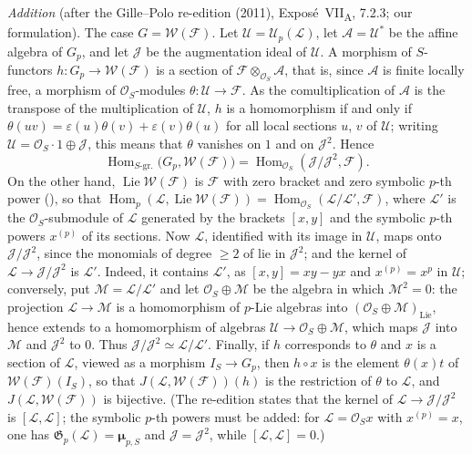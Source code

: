 \par\medskip\noindent
\emph{Addition} (after the Gille--Polo re-edition (2011),
Expos\'e~VII\textsubscript{A}, 7.2.3; our formulation). The case
\(G=\mathcal W(\mathcal F)\). Let \(\mathcal U=\mathcal U_p(\mathcal L)\),
let \(\mathcal A=\mathcal U^{*}\) be the affine algebra of \(G_p\), and
let \(\mathcal J\) be the augmentation ideal of \(\mathcal U\). A morphism
of \(S\)-functors \(h:G_p\to\mathcal W(\mathcal F)\) is a section of
\(\mathcal F\otimes_{\mathcal O_S}\mathcal A\), that is, since
\(\mathcal A\) is finite locally free, a morphism of
\(\mathcal O_S\)-modules \(\theta:\mathcal U\to\mathcal F\). As the
comultiplication of \(\mathcal A\) is the transpose of the multiplication
of \(\mathcal U\), \(h\) is a homomorphism if and only if
\(\theta(uv)=\varepsilon(u)\theta(v)+\varepsilon(v)\theta(u)\) for all
local sections \(u\), \(v\) of \(\mathcal U\); writing
\(\mathcal U=\mathcal O_S\cdot1\oplus\mathcal J\), this means that
\(\theta\) vanishes on \(1\) and on \(\mathcal J^2\). Hence
\[
  \operatorname{Hom}_{S\text{-gr.}}\bigl(G_p,\mathcal W(\mathcal F)\bigr)
  =\operatorname{Hom}_{\mathcal O_S}(\mathcal J/\mathcal J^2,\mathcal F).
\]
On the other hand, \(\operatorname{Lie}\mathcal W(\mathcal F)\) is
\(\mathcal F\) with zero bracket and zero symbolic \(p\)-th power
(), so that
\(\operatorname{Hom}_p(\mathcal L,\operatorname{Lie}\mathcal W(\mathcal F))
=\operatorname{Hom}_{\mathcal O_S}(\mathcal L/\mathcal L',\mathcal F)\),
where \(\mathcal L'\) is the \(\mathcal O_S\)-submodule of \(\mathcal L\)
generated by the brackets \([x,y]\) and the symbolic \(p\)-th powers
\(x^{(p)}\) of its sections. Now \(\mathcal L\), identified with its image
in \(\mathcal U\), maps onto \(\mathcal J/\mathcal J^2\), since the
monomials of degree \(\geq2\) of  lie in \(\mathcal J^2\); and
the kernel of \(\mathcal L\to\mathcal J/\mathcal J^2\) is
\(\mathcal L'\). Indeed, it contains \(\mathcal L'\), as \([x,y]=xy-yx\)
and \(x^{(p)}=x^p\) in \(\mathcal U\); conversely, put
\(\mathcal M=\mathcal L/\mathcal L'\) and let
\(\mathcal O_S\oplus\mathcal M\) be the algebra in which
\(\mathcal M^2=0\): the projection \(\mathcal L\to\mathcal M\) is a
homomorphism of \(p\)-Lie algebras into
\((\mathcal O_S\oplus\mathcal M)_{\mathrm{Lie}}\), hence extends to a
homomorphism of algebras \(\mathcal U\to\mathcal O_S\oplus\mathcal M\),
which maps \(\mathcal J\) into \(\mathcal M\) and \(\mathcal J^2\) to
\(0\). Thus \(\mathcal J/\mathcal J^2\simeq\mathcal L/\mathcal L'\).
Finally, if \(h\) corresponds to \(\theta\) and \(x\) is a section of
\(\mathcal L\), viewed as a morphism \(I_S\to G_p\), then \(h\circ x\) is
the element \(\theta(x)t\) of \(\mathcal W(\mathcal F)(I_S)\), so that
\(J(\mathcal L,\mathcal W(\mathcal F))(h)\) is the restriction of
\(\theta\) to \(\mathcal L\), and \(J(\mathcal L,\mathcal W(\mathcal F))\)
is bijective. (The re-edition states that the kernel of
\(\mathcal L\to\mathcal J/\mathcal J^2\) is \([\mathcal L,\mathcal L]\);
the symbolic \(p\)-th powers must be added: for
\(\mathcal L=\mathcal O_Sx\) with \(x^{(p)}=x\), one has
\(\mathfrak G_p(\mathcal L)=\boldsymbol\mu_{p,S}\) and
\(\mathcal J=\mathcal J^2\), while \([\mathcal L,\mathcal L]=0\).)

